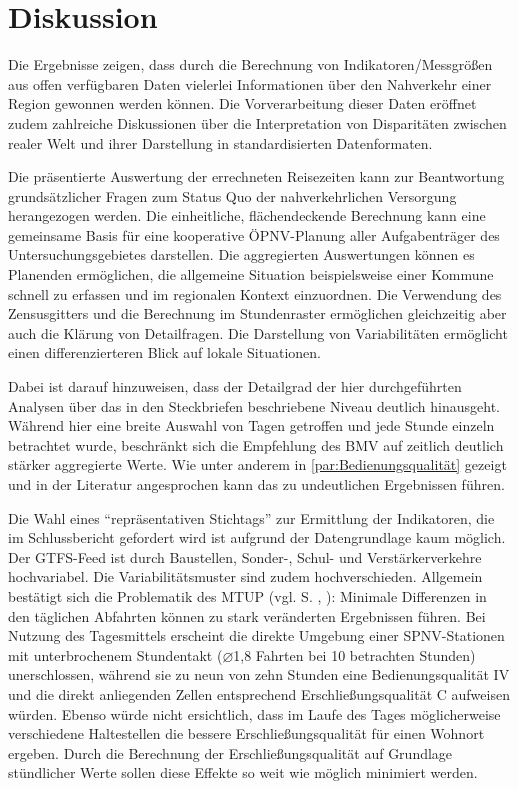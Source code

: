 \documentclass[11pt,pdftex,a4paper]{scrartcl}
\begin{document}
	\section{Diskussion} \label{sec:Diskussion}
	Die Ergebnisse zeigen, dass durch die Berechnung von Indikatoren/Messgrößen aus offen verfügbaren Daten vielerlei Informationen über den Nahverkehr einer Region gewonnen werden können. Die Vorverarbeitung dieser Daten eröffnet zudem zahlreiche Diskussionen über die Interpretation von Disparitäten zwischen realer Welt und ihrer Darstellung in standardisierten Datenformaten.
	
	Die präsentierte Auswertung der errechneten Reisezeiten kann zur Beantwortung grundsätzlicher Fragen zum Status Quo der nahverkehrlichen Versorgung herangezogen werden. Die einheitliche, flächendeckende Berechnung kann eine gemeinsame Basis für eine kooperative ÖPNV-Planung aller Aufgabenträger des Untersuchungsgebietes darstellen. Die aggregierten Auswertungen können es Planenden ermöglichen, die allgemeine Situation beispielsweise einer Kommune schnell zu erfassen und im regionalen Kontext einzuordnen. Die Verwendung des Zensusgitters und die Berechnung im Stundenraster ermöglichen gleichzeitig aber auch die Klärung von Detailfragen. Die Darstellung von Variabilitäten ermöglicht einen differenzierteren Blick auf lokale Situationen.

	Dabei ist darauf hinzuweisen, dass der Detailgrad der hier durchgeführten Analysen über das in den Steckbriefen beschriebene Niveau deutlich hinausgeht. Während hier eine breite Auswahl von Tagen getroffen und jede Stunde einzeln betrachtet wurde, beschränkt sich die Empfehlung des BMV auf zeitlich deutlich stärker aggregierte Werte. Wie unter anderem in \ref{par:Bedienungsqualität} gezeigt und in der Literatur angesprochen \parencite[u.a.][]{stepniakImpactTemporalResolution2019} kann das zu undeutlichen Ergebnissen führen.
	
	Die Wahl eines \enquote{repräsentativen Stichtags} zur Ermittlung der Indikatoren, die im Schlussbericht gefordert wird \parencite[173, 184]{kcwgmbhMethodikUndEmpfehlungen2024} ist aufgrund der Datengrundlage kaum möglich. Der GTFS-Feed ist durch Baustellen, Sonder-, Schul- und Verstärkerverkehre hochvariabel. Die Variabilitätsmuster sind zudem hochverschieden. Allgemein bestätigt sich die Problematik des MTUP (vgl. S. \pageref{par:MTUP}, \textcite{lindnerWhenMeasureAccessibility2024}): Minimale Differenzen in den täglichen Abfahrten können zu stark veränderten Ergebnissen führen. Bei Nutzung des Tagesmittels erscheint die direkte Umgebung einer SPNV-Stationen mit unterbrochenem Stundentakt ($\varnothing$1,8 Fahrten bei 10 betrachten Stunden) unerschlossen, während sie zu  neun von zehn Stunden eine Bedienungsqualität IV und die direkt anliegenden Zellen entsprechend Erschließungsqualität C aufweisen würden. Ebenso würde nicht ersichtlich, dass im Laufe des Tages möglicherweise verschiedene Haltestellen die bessere Erschließungsqualität für einen Wohnort ergeben. Durch die Berechnung der Erschließungsqualität auf Grundlage stündlicher Werte sollen diese Effekte so weit wie möglich minimiert werden.
	
\end{document}
